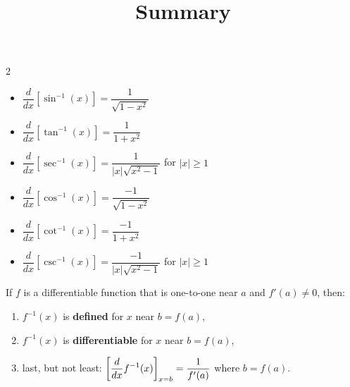 \documentclass{ximera}
\title[Summary]{Summary}
\begin{document}
\begin{abstract} \end{abstract}
\maketitle


	\begin{multicols}{2}
		\begin{itemize}

			\item $\displaystyle \dfrac{d}{dx}\left[ \sin^{-1}(x) \right] = \dfrac{1}{\sqrt{1-x^2}}$

			\item $\displaystyle \dfrac{d}{dx}\left[ \tan^{-1}(x) \right] = \dfrac{1}{1+x^2}$
			
			\item $\displaystyle \dfrac{d}{dx}\left[ \sec^{-1}(x) \right] = \dfrac{1}{|x|\sqrt{x^2-1}}$ for $|x| \geq 1$
			
			\item $\displaystyle \dfrac{d}{dx}\left[ \cos^{-1}(x) \right] = \dfrac{-1}{\sqrt{1-x^2}}$

			\item $\displaystyle \dfrac{d}{dx}\left[ \cot^{-1}(x) \right] = \dfrac{-1}{1+x^2}$
			
			\item $\displaystyle \dfrac{d}{dx}\left[ \csc^{-1}(x) \right] = \dfrac{-1}{|x|\sqrt{x^2-1}}$ for $|x| \geq 1$

		\end{itemize}
	\end{multicols}


	\begin{theorem}
		If $f$ is a differentiable function that is one-to-one near $a$ and $f'(a) \neq 0$, then:
		\begin{enumerate}
			\item[(a)] $f^{-1}(x)$ is \textbf{defined} for $x$ near $b = f(a)$,

			\item[(b)] $f^{-1}(x)$ is \textbf{differentiable} for $x$ near $b = f(a)$,

			\item[(c)] last, but not least: $\displaystyle \bigg[  \dfrac{d}{dx} f^{-1}(x)  \bigg]_{x=b} = \dfrac{1}{f'(a)}$ where $b = f(a)$.

		\end{enumerate}
	\end{theorem}
\end{document}
